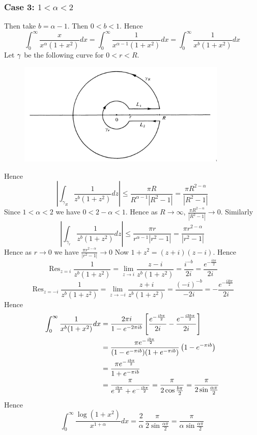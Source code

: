 \documentclass[a4paper, 11pt]{article}
\newcommand{\Res}{\operatorname{Res}}
\begin{document}
{\begin{enumerate}[label=(\alph*)]
\subsubsection*{Case 3: $1<\alpha<2$}
Then take $b=\alpha-1$. Then $0<b<1$. Hence $$\int_0^{\infty} \frac{x}{x^\alpha\left(1+x^2\right)} d x= \int_0^{\infty} \frac{1}{x^{\alpha-1}(1+x^2)} d x= \int_0^{\infty} \frac{1}{x^b(1+x^2)} d x$$Let $\gamma$ be the following curve for $0<r<R$. 

\begin{figure}[h]
	\centering
	\includegraphics[width=10cm]{keyhole.png}
\end{figure}

Hence $$\left|\int_{\gamma_R} \frac{1}{z^b \left(1+z^2\right)} d z\right| \leq \frac{\pi R}{R^{\alpha-1}\left|R^2-1\right|}=\frac{\pi R^{2-\alpha}}{\left|R^2-1\right|}$$Since $1<\alpha<2$ we have $0<2-\alpha<1$. Hence as $R\to \infty$, $\frac{\pi R^{2-\alpha}}{\left|R^2-1\right|}\to 0$. Similarly $$\left|\int_{\gamma_r} \frac{1}{z^b \left(1+z^2\right)} d z\right| \leq \frac{\pi r}{r^{\alpha-1}\left|r^2-1\right|}=\frac{\pi r^{2-\alpha}}{\left|r^2-1\right|}$$Hence as $r\to 0$ we have $\frac{\pi r^{2-\alpha}}{\left|r^2-1\right|}\to 0$ Now $1+z^2=(z+i)(z-i)$. Hence 
$$\Res_{z= i}\frac{1}{z^b(1+z^2)}=\lim\limits_{z\to  i}\frac{z-i}{z^b(1+z^2)}=\frac{i^{-b}}{2i}=\frac{e^{-\frac{ib\pi}{2}}}{2i}$$
$$\Res_{z=-i}\frac{1}{z^b(1+z^2)}=\lim\limits_{z\to -i}\frac{z+i}{z^b(1+z^2)}=\frac{(-i)^{-b}}{-2i}=-\frac{e^{-\frac{i3b\pi}{2}}}{2i}$$Hence \begin{align*}
	\int_0^{\infty} \frac{1}{x^b(1+x^2)} d x & =\frac{2\pi i}{1-e^{-2\pi i b}}\left[\frac{e^{-\frac{ib\pi}{2}}}{2i}-\frac{e^{-\frac{i3b\pi}{2}}}{2i} \right]                       \\
	                                         & = \frac{\pi e^{-\frac{ib\pi}{2}}}{(1-e^{-\pi i b})(1+e^{-\pi i b})}\left(1-e^{-\pi i b}  \right)                                    \\
	                                         & = \frac{\pi e^{-\frac{ib\pi}{2}}}{1+e^{-\pi i b}}                                                                              \\
	                                         & = \frac{\pi}{e^{\frac{ib\pi}{2}}+e^{-\frac{ib\pi}{2}}}=\frac{\pi}{2\cos \frac{b\pi}{2}}=\frac{\pi}{2\sin \frac{\alpha \pi}{2}}
\end{align*}Hence $$	\int_0^{\infty} \frac{\log \left(1+x^2\right)}{x^{1+\alpha}} d x=\frac{2}{\alpha} \, \frac{\pi}{2\sin \frac{\alpha \pi}{2}}=\frac{\pi}{\alpha\sin \frac{\alpha \pi}{2}}$$


\end{enumerate}}
\end{document}
